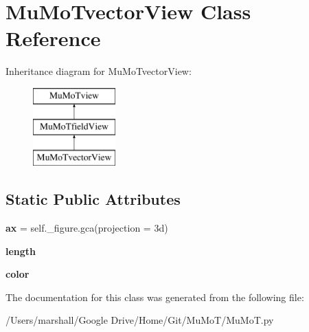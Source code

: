 \hypertarget{class_mu_mo_t_1_1_mu_mo_tvector_view}{}\section{Mu\+Mo\+Tvector\+View Class Reference}
\label{class_mu_mo_t_1_1_mu_mo_tvector_view}
Inheritance diagram for Mu\+Mo\+Tvector\+View\+:\begin{figure}[H]
\begin{center}
\leavevmode
\includegraphics[height=3.000000cm]{class_mu_mo_t_1_1_mu_mo_tvector_view}
\end{center}
\end{figure}
\subsection*{Static Public Attributes}
\begin{DoxyCompactItemize}
\item 
\mbox{\label{class_mu_mo_t_1_1_mu_mo_tvector_view_a8fa675eb2fcec5b95d9d21c670da7f30}} 
{\bfseries ax} = self.\+\_\+figure.\+gca(projection = \textquotesingle{}3d\textquotesingle{})
\item 
\mbox{\label{class_mu_mo_t_1_1_mu_mo_tvector_view_af9d495c1655d813d553030485d00fea7}} 
{\bfseries length}
\item 
\mbox{\label{class_mu_mo_t_1_1_mu_mo_tvector_view_a37dbdc30935031c05304482e1be89d8f}} 
{\bfseries color}
\end{DoxyCompactItemize}


The documentation for this class was generated from the following file\+:\begin{DoxyCompactItemize}
\item 
/\+Users/marshall/\+Google Drive/\+Home/\+Git/\+Mu\+Mo\+T/Mu\+Mo\+T.\+py\end{DoxyCompactItemize}
